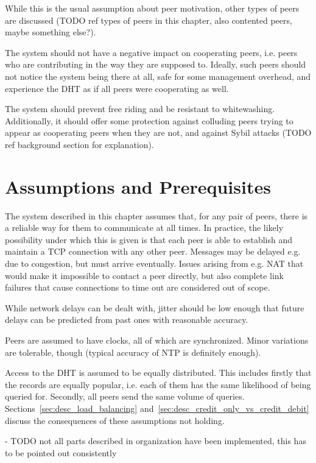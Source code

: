 While this is the usual assumption about peer motivation, other types of peers
are discussed (TODO ref types of peers in this chapter, also contented peers,
maybe something else?).

The system should not have a negative impact on cooperating peers, i.e. peers
who are contributing in the way they are supposed to. Ideally, such peers should
not notice the system being there at all, safe for some management overhead, and
experience the \ac{DHT} as if all peers were cooperating as well.

The system should prevent free riding and be resistant to whitewashing.
Additionally, it should offer some protection against colluding peers trying to
appear as cooperating peers when they are not, and against Sybil attacks (TODO
ref background section for explanation).

\section{Assumptions and Prerequisites}
The system described in this chapter assumes that, for any pair of peers, there
is a reliable way for them to communicate at all times. In practice, the likely
possibility under which this is given is that each peer is able to establish and
maintain a TCP connection with any other peer. Messages may be delayed e.g. due
to congestion, but must arrive eventually. Issues arising from e.g. NAT that
would make it impossible to contact a peer directly, but also complete link
failures that cause connections to time out are considered out of scope.

While network delays can be dealt with, jitter should be low enough that future
delays can be predicted from past ones with reasonable accuracy.

Peers are assumed to have clocks, all of which are synchronized. Minor
variations are tolerable, though (typical accuracy of NTP is definitely enough).

Access to the \ac{DHT} is assumed to be equally distributed. This includes
firstly that the records are equally popular, i.e. each of them has the same
likelihood of being queried for. Secondly, all peers send the same volume of
queries. Sections~\ref{sec:desc_load_balancing}
and~\ref{sec:desc_credit_only_vs_credit_debit} discuss the consequences of these
assumptions not holding.

- TODO not all parts described in organization have been implemented, this has
  to be pointed out consistently

